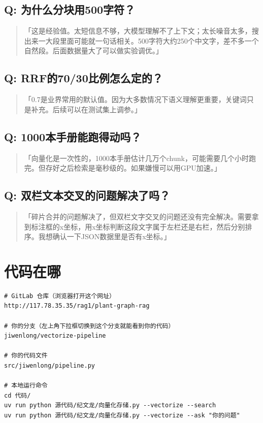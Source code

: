 \documentclass[12pt,a4paper,landscape]{article}
\begin{document}
\subsection{Q: 为什么分块用500字符？}
\begin{quote}
\kaishu
「这是经验值。太短信息不够，大模型理解不了上下文；太长噪音太多，搜出来一大段里面可能就一句话相关。500字符大约250个中文字，差不多一个自然段。后面数据量大了可以做实验调优。」
\end{quote}

\subsection{Q: RRF的70/30比例怎么定的？}
\begin{quote}
\kaishu
「0.7是业界常用的默认值。因为大多数情况下语义理解更重要，关键词只是补充。后续可以在测试集上调参。」
\end{quote}

\subsection{Q: 1000本手册能跑得动吗？}
\begin{quote}
\kaishu
「向量化是一次性的，1000本手册估计几万个chunk，可能需要几个小时跑完。但存好之后检索是毫秒级的。如果嫌慢可以用GPU加速。」
\end{quote}

\subsection{Q: 双栏文本交叉的问题解决了吗？}
\begin{quote}
\kaishu
「碎片合并的问题解决了，但双栏文字交叉的问题还没有完全解决。需要拿到标注框的x坐标，用x坐标判断这段文字属于左栏还是右栏，然后分别排序。我想确认一下JSON数据里是否有x坐标。」
\end{quote}

\section{代码在哪}

\begin{lstlisting}
# GitLab 仓库（浏览器打开这个网址）
http://117.78.35.35/rag1/plant-graph-rag

# 你的分支（左上角下拉框切换到这个分支就能看到你的代码）
jiwenlong/vectorize-pipeline

# 你的代码文件
src/jiwenlong/pipeline.py

# 本地运行命令
cd 代码/
uv run python 源代码/纪文龙/向量化存储.py --vectorize --search
uv run python 源代码/纪文龙/向量化存储.py --vectorize --ask "你的问题"
\end{lstlisting}
\end{document}
